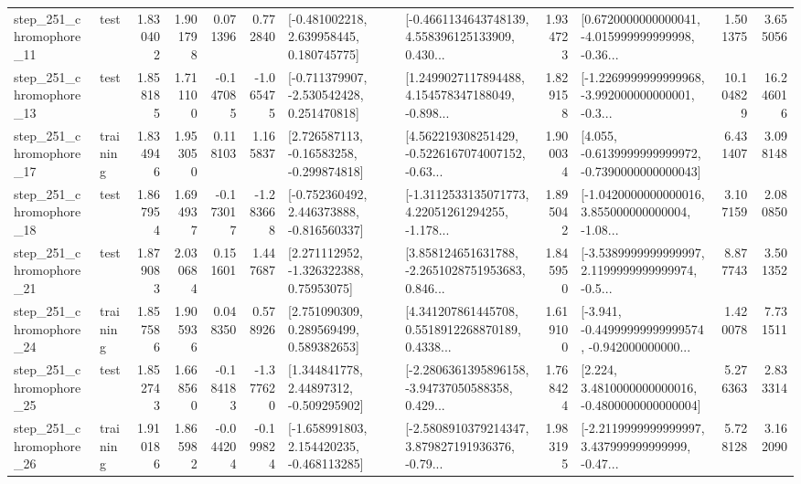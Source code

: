 \begin{tabular}{llrrrrllrlrr}
  step\_251\_chromophore\_11 &      test &      1.830402 &    1.901798 &      0.071396 &  0.772840 &    [-0.481002218, 2.639958445, 0.180745775] &  [-0.4661134643748139, 4.558396125133909, 0.430... &       1.934723 &  [0.6720000000000041, -4.015999999999998, -0.36... &            1.501375 &          3.655056 \\
  step\_251\_chromophore\_13 &      test &      1.858185 &    1.711100 &     -0.147085 & -1.065475 &   [-0.711379907, -2.530542428, 0.251470818] &  [1.2499027117894488, 4.154578347188049, -0.898... &       1.829158 &  [-1.2269999999999968, -3.992000000000001, -0.3... &           10.104829 &         16.246016 \\
  step\_251\_chromophore\_17 &  training &      1.834946 &    1.953050 &      0.118103 &  1.165837 &    [2.726587113, -0.16583258, -0.299874818] &  [4.562219308251429, -0.5226167074007152, -0.63... &       1.900034 &  [4.055, -0.6139999999999972, -0.7390000000000043] &            6.431407 &          3.098148 \\
  step\_251\_chromophore\_18 &      test &      1.867954 &    1.694937 &     -0.173017 & -1.283668 &   [-0.752360492, 2.446373888, -0.816560337] &  [-1.3112533135071773, 4.22051261294255, -1.178... &       1.895042 &  [-1.0420000000000016, 3.855000000000004, -1.08... &            3.107159 &          2.080850 \\
  step\_251\_chromophore\_21 &      test &      1.879083 &    2.030684 &      0.151601 &  1.447687 &     [2.271112952, -1.326322388, 0.75953075] &  [3.858124651631788, -2.2651028751953683, 0.846... &       1.845950 &  [-3.5389999999999997, 2.1199999999999974, -0.5... &            8.877743 &          3.501352 \\
  step\_251\_chromophore\_24 &  training &      1.857586 &    1.905936 &      0.048350 &  0.578926 &     [2.751090309, 0.289569499, 0.589382653] &  [4.341207861445708, 0.5518912268870189, 0.4338... &       1.619100 &  [-3.941, -0.44999999999999574, -0.942000000000... &            1.420078 &          7.731511 \\
  step\_251\_chromophore\_25 &      test &      1.852743 &    1.668560 &     -0.184183 & -1.377620 &     [1.344841778, 2.44897312, -0.509295902] &  [-2.2806361395896158, -3.94737050588358, 0.429... &       1.768424 &   [2.224, 3.4810000000000016, -0.4800000000000004] &            5.276363 &          2.833314 \\
  step\_251\_chromophore\_26 &  training &      1.910186 &    1.865982 &     -0.044204 & -0.199824 &   [-1.658991803, 2.154420235, -0.468113285] &  [-2.5808910379214347, 3.879827191936376, -0.79... &       1.983195 &  [-2.2119999999999997, 3.437999999999999, -0.47... &            5.728128 &          3.162090 \\

\end{tabular}
